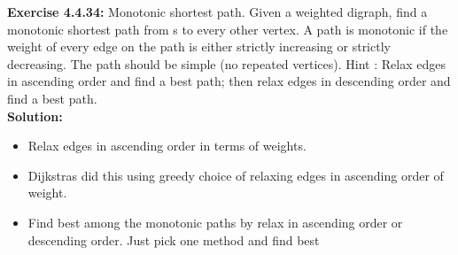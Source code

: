 \documentclass[11pt,fleqn]{article}
\begin{document}
\textbf{Exercise 4.4.34:}  Monotonic shortest path. Given a weighted digraph, find a monotonic shortest
path from s to every other vertex. A path is monotonic if the weight of every edge on
the path is either strictly increasing or strictly decreasing. The path should be simple
(no repeated vertices). Hint : Relax edges in ascending order and find a best path; then
relax edges in descending order and find a best path.\\

\textbf{Solution:}

\begin{itemize}
	\item Relax edges in ascending order in terms of weights.
	\item Dijkstras did this using greedy choice of relaxing edges in ascending order of weight.
	\item Find best among the monotonic paths by relax in ascending order or descending order. Just pick one method and find best
\end{itemize}


	
\end{document}
